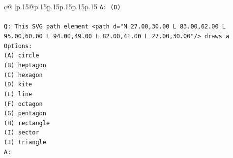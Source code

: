 \documentclass{article}
\begin{document}
{\begin{supertabular}{c@{$\;$}|p{.15\linewidth}@{}p{.15\linewidth}p{.15\linewidth}p{.15\linewidth}p{.15\linewidth}p{.15\linewidth}}
{{{\texttt{A: (D)} \\
\\ 
\texttt{Q: This SVG path element <path d="M 27.00,30.00 L 83.00,62.00 L 95.00,60.00 L 94.00,49.00 L 82.00,41.00 L 27.00,30.00"/> draws a} \\
\texttt{Options:} \\
\texttt{(A) circle} \\
\texttt{(B) heptagon} \\
\texttt{(C) hexagon} \\
\texttt{(D) kite} \\
\texttt{(E) line} \\
\texttt{(F) octagon} \\
\texttt{(G) pentagon} \\
\texttt{(H) rectangle} \\
\texttt{(I) sector} \\
\texttt{(J) triangle} \\
\texttt{A:} \\
            }
        }
    }
     \\ \\


\end{supertabular}}
\end{document}
